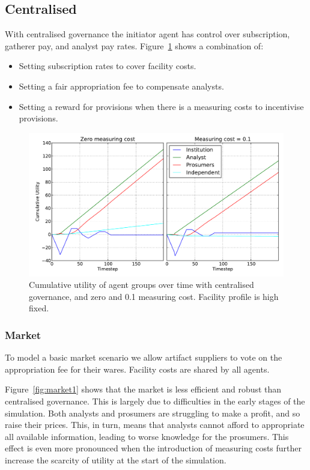 \subsection{Centralised}

With centralised governance the initiator agent has control over subscription, gatherer pay, and analyst pay rates. Figure~\ref{fig:centralised1} shows a combination of:
\begin{itemize}
\item Setting subscription rates to cover facility costs.
\item Setting a fair appropriation fee to compensate analysts.
\item Setting a reward for provisions when there is a measuring costs to incentivise provisions.
\end{itemize}

\begin{figure}
\includegraphics[width=\linewidth]{gfx/kc/centralised1.pdf} 
\caption{Cumulative utility of agent groups over time with centralised governance, and zero and 0.1 measuring cost. Facility profile is high fixed.}\label{fig:centralised1}
\end{figure}

\subsubsection{Market}

To model a basic market scenario we allow artifact suppliers to vote on the appropriation fee for their wares. Facility costs are shared by all agents.

Figure~\ref{fig:market1} shows that the market is less efficient and robust than centralised governance. This is largely due to difficulties in the early stages of the simulation. Both analysts and prosumers are struggling to make a profit, and so raise their prices. This, in turn, means that analysts cannot afford to appropriate all available information, leading to worse knowledge for the prosumers. This effect is even more pronounced when the introduction of measuring costs further increase the scarcity of utility at the start of the simulation.

